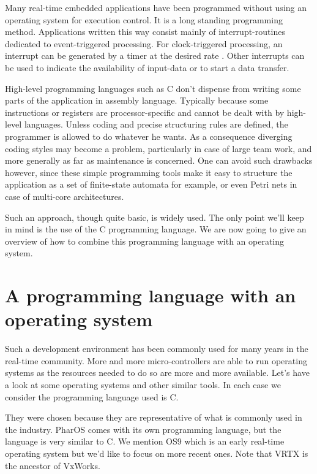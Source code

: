 \documentclass[10pt]{report}
\begin{document}
Many real-time embedded applications have been programmed without 
using an operating system for execution control. It is a long 
standing programming method. Applications written this way 
consist mainly of interrupt-routines dedicated to event-triggered 
processing. For clock-triggered processing, an interrupt can be 
generated by a timer at the desired rate . Other interrupts can 
be used to indicate the availability of input-data or to start a 
data transfer.

High-level programming languages such as C don't dispense from 
writing some parts of the application in assembly language. 
Typically because some instructions or registers are 
processor-specific and cannot be dealt with by high-level 
languages. Unless coding and precise structuring rules are 
defined, the programmer is allowed to do whatever he wants. As a 
consequence diverging coding styles may become a problem, 
particularly in case of large team work, and more generally as 
far as maintenance is concerned. One can avoid such drawbacks 
however, since these simple programming tools make it easy to 
structure the application as a set of finite-state automata for 
example, or even Petri nets in case of multi-core architectures.

Such an approach, though quite basic, is widely used. The only 
point we'll keep in mind is the use of the C programming 
language. We are now going to give an overview of how to combine 
this programming language with an operating system.


\section{A programming language with an operating system}

Such a development environment has been commonly used for many 
years in the real-time community. More and more micro-controllers 
are able to run operating systems as the resources needed to do 
so are more and more available. Let's have a look at some 
operating systems and other similar tools. In each case we 
consider the programming language used is C. 

They were chosen because they are representative of what is 
commonly used in the industry. PharOS comes with its own 
programming language, but the language is very similar to C. We 
mention OS9 which is an early real-time operating system but we'd 
like to focus on more recent ones. Note that VRTX is the ancestor 
of VxWorks.
\end{document}
